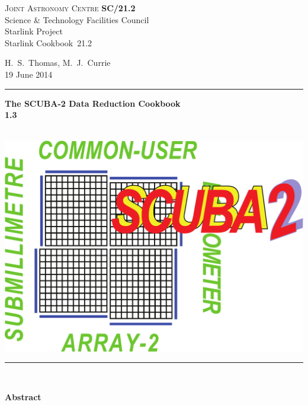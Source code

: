 \documentclass[twoside,11pt]{article}
\newcommand{\stardoccategory}  {Starlink Cookbook}
\newcommand{\stardocinitials}  {SC}
\newcommand{\stardocnumber}    {21.2}
\newcommand{\stardocauthors}   {H.\ S.\ Thomas, M.\ J.\ Currie}
\newcommand{\stardocdate}      {19 June 2014}
\newcommand{\stardoctitle}     {The SCUBA-2 Data Reduction Cookbook}
\newcommand{\stardocversion}   {1.3}
\newcommand{\stardocmanual}    {\ }
\newcommand{\stardocname}{\stardocinitials /\stardocnumber}
\newenvironment{latexonly}{}{}
\renewcommand{\_}{\texttt{\symbol{95}}}
\begin{document}
\thispagestyle{empty}

\begin{latexonly}
   \textsc{Joint Astronomy Centre} \hfill \textbf{\stardocname}\\
   {\large Science \& Technology Facilities Council}\\
   {\large Starlink Project\\}
   {\large \stardoccategory\ \stardocnumber}
   \begin{flushright}
   \stardocauthors\\
   \stardocdate
   \end{flushright}
   \vspace{-4mm}
   \rule{\textwidth}{0.5mm}
   \vspace{5mm}
   \begin{center}
   {\Huge\textbf{\stardoctitle \\ [2.5ex]}}
   {\LARGE\textbf{\stardocversion \\ [4ex]}}
   {\Huge\textbf{\stardocmanual}}
   \end{center}
   \vspace{5mm}

   \begin{center}
   \includegraphics[scale=0.4]{sc21_s2logo}
   \end{center}
   \vspace{5mm}
   \rule{\textwidth}{0.5mm}\\
   \vspace{15mm}

   \vspace{10mm}
   \begin{center}
      {\Large\textbf{Abstract}}
   \end{center}

\end{latexonly}
\end{document}
